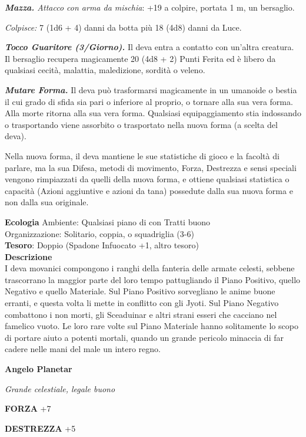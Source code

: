 \begin{multicols}{2}
\textit{\textbf{Mazza.} Attacco con arma da mischia}: +19 a colpire, portata 1 m, un bersaglio.

\textit{Colpisce:} 7 (1d6 + 4) danni da botta più 18 (4d8) danni da Luce.

\textit{\textbf{Tocco Guaritore (3/Giorno).}} Il deva entra a contatto con un'altra creatura. Il bersaglio recupera magicamente 20 (4d8 + 2) Punti Ferita ed è libero da qualsiasi cecità, malattia, maledizione, sordità o veleno.

\textit{\textbf{Mutare Forma.}} Il deva può trasformarsi magicamente in un umanoide o bestia il cui grado di sfida sia pari o inferiore al proprio, o tornare alla sua vera forma. Alla morte ritorna alla sua vera forma. Qualsiasi equipaggiamento stia indossando o trasportando viene assorbito o trasportato nella nuova forma (a scelta del deva).

Nella nuova forma, il deva mantiene le sue statistiche di gioco e la facoltà di parlare, ma la sua Difesa, metodi di movimento, Forza, Destrezza e sensi speciali vengono rimpiazzati da quelli della nuova forma, e ottiene qualsiasi statistica o capacità (Azioni aggiuntive e azioni da tana) possedute dalla sua nuova forma e non dalla sua originale.

\textbf{Ecologia}
Ambiente: Qualsiasi piano di con Tratti buono\\
Organizzazione: Solitario, coppia, o squadriglia (3-6)\\
\textbf{Tesoro}: Doppio (Spadone Infuocato +1, altro tesoro)\\
\textbf{Descrizione}\\
I deva movanici compongono i ranghi della fanteria delle armate celesti, sebbene trascorrano la maggior parte del loro tempo pattugliando il Piano Positivo, quello Negativo e quello Materiale. Sul Piano Positivo sorvegliano le anime buone erranti, e questa volta li mette in conflitto con gli Jyoti. Sul Piano Negativo combattono i non morti, gli Sceaduinar e altri strani esseri che cacciano nel famelico vuoto. Le loro rare volte sul Piano Materiale hanno solitamente lo scopo di portare aiuto a potenti mortali, quando un grande pericolo minaccia di far cadere nelle mani del male un intero regno.

\medskip{}\textbf{Angelo Planetar}

\textit{Grande celestiale, legale buono}

\textbf{FORZA} +7

\textbf{DESTREZZA} +5


\end{multicols}
